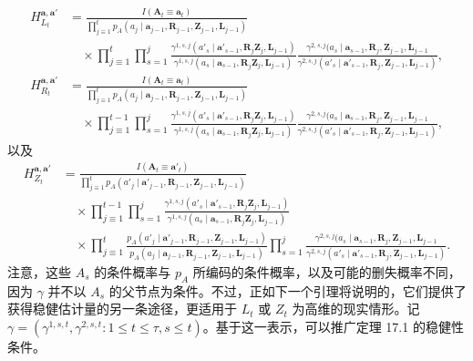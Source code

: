 \[
\begin{aligned}
 H_{L_t}^{\mathbf a,\mathbf a'}
 &=\frac{I(\mathbf A_t\equiv\mathbf a_t)}
 {\prod_{j\equiv1}^t p_A(a_j\mid\mathbf a_{j-1},\mathbf R_{j-1},\mathbf Z_{j-1},\mathbf L_{j-1})}\\
 &\quad{}\times\prod_{j\equiv1}^t\prod_{s=1}^j
 \frac{\gamma^{1,s,j}(a'_s\mid\mathbf a'_{s-1},\mathbf R_j\mathbf Z_j,\mathbf L_{j-1})}
 {\gamma^{1,s,j}(a_s\mid\mathbf a_{s-1},\mathbf R_j\mathbf Z_j,\mathbf L_{j-1})}
 \frac{\gamma^{2,s,j}(a_s\mid\mathbf a_{s-1},\mathbf R_j,\mathbf Z_{j-1},\mathbf L_{j-1}}
 {\gamma^{2,s,j}(a'_s\mid\mathbf a'_{s-1},\mathbf R_j,\mathbf Z_{j-1},\mathbf L_{j-1})},\\
 H_{R_t}^{\mathbf a,\mathbf a'}
 &=\frac{I(\mathbf A_t\equiv\mathbf a_t)}
 {\prod_{j\equiv1}^t p_A(a_j\mid\mathbf a_{j-1},\mathbf R_{j-1},\mathbf Z_{j-1},\mathbf L_{j-1})}\\
 &\quad{}\times\prod_{j\equiv1}^{t-1}\prod_{s=1}^j
 \frac{\gamma^{1,s,j}(a'_s\mid\mathbf a'_{s-1},\mathbf R_j\mathbf Z_j,\mathbf L_{j-1})}
 {\gamma^{1,s,j}(a_s\mid\mathbf a_{s-1},\mathbf R_j\mathbf Z_j,\mathbf L_{j-1})}
 \frac{\gamma^{2,s,j}(a_s\mid\mathbf a_{s-1},\mathbf R_j,\mathbf Z_{j-1},\mathbf L_{j-1}}
 {\gamma^{2,s,j}(a'_s\mid\mathbf a'_{s-1},\mathbf R_j,\mathbf Z_{j-1},\mathbf L_{j-1})},
\end{aligned}
\]
以及
\[
\begin{aligned}
 H_{Z_t}^{\mathbf a,\mathbf a'}
 &=\frac{I(\mathbf A_t\equiv\mathbf a'_t)}
 {\prod_{j\equiv1}^t p_A(a'_j\mid\mathbf a'_{j-1},\mathbf R_{j-1},\mathbf Z_{j-1},\mathbf L_{j-1})}\\
 &\quad{}\times\prod_{j\equiv1}^{t-1}\prod_{s=1}^j
 \frac{\gamma^{1,s,j}(a'_s\mid\mathbf a'_{s-1},\mathbf R_j\mathbf Z_j,\mathbf L_{j-1})}
 {\gamma^{1,s,j}(a_s\mid\mathbf a_{s-1},\mathbf R_j\mathbf Z_j,\mathbf L_{j-1})}\\
 &\quad{}\times\prod_{j\equiv1}^{t}
 \frac{p_A(a'_j\mid\mathbf a'_{j-1},\mathbf R_{j-1},\mathbf Z_{j-1},\mathbf L_{j-1})}
 {p_A(a_j\mid\mathbf a_{j-1},\mathbf R_{j-1},\mathbf Z_{j-1},\mathbf L_{j-1})}
 \prod_{s=1}^j
 \frac{\gamma^{2,s,j}(a_s\mid\mathbf a_{s-1},\mathbf R_j,\mathbf Z_{j-1},\mathbf L_{j-1}}
 {\gamma^{2,s,j}(a'_s\mid\mathbf a'_{s-1},\mathbf R_j,\mathbf Z_{j-1},\mathbf L_{j-1})}.
\end{aligned}
\]
注意，这些 $A_s$ 的条件概率与 $p_A$ 所编码的条件概率，以及可能的删失概率不同，因为 $\gamma$ 并不以 $A_s$ 的父节点为条件。不过，正如下一个引理将说明的，它们提供了获得稳健估计量的另一条途径，更适用于 $L_t$ 或 $Z_t$ 为高维的现实情形。记 $\gamma=(\gamma^{1,s,t},\gamma^{2,s,t}:1\leq t\leq\tau,s\leq t)$。基于这一表示，可以推广定理 17.1 的稳健性条件。

